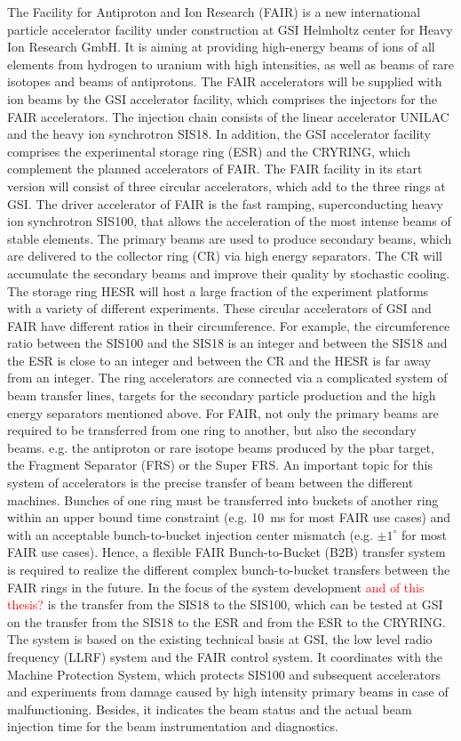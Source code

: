 The Facility for Antiproton and Ion Research (FAIR) is a new international particle accelerator facility under construction at GSI Helmholtz center for Heavy Ion Research GmbH. It is aiming at providing high-energy beams of ions of all elements from hydrogen to uranium with high intensities, as well as beams of rare isotopes and beams of antiprotons. The FAIR accelerators will be supplied with ion beams by the GSI accelerator facility, which comprises the injectors for the FAIR accelerators. The injection chain consists of the linear accelerator UNILAC and the heavy ion synchrotron SIS18. In addition, the GSI accelerator facility comprises the experimental storage ring (ESR) and the CRYRING, which complement the planned accelerators of FAIR. The FAIR facility in its start version will consist of three circular accelerators, which add to the three rings at GSI. The driver accelerator of FAIR is the fast ramping, superconducting heavy ion synchrotron SIS100, that allows the acceleration of the most intense beams of stable elements. The primary beams are used to produce secondary beams, which are delivered to the collector ring (CR) via high energy separators. The CR will accumulate the secondary beams and improve their quality by stochastic cooling. The storage ring HESR will host a large fraction of the experiment platforms with a variety of different experiments. These circular accelerators of GSI and FAIR have different ratios in their circumference. For example, the circumference ratio between the SIS100 and the SIS18 is an integer and between the SIS18 and the ESR is close to an integer and between the CR and the HESR is far away from an integer. The ring accelerators are connected via a complicated system of beam transfer lines, targets for the secondary particle production and the high energy separators mentioned above. For FAIR, not only the primary beams are required to be transferred from one ring to another, but also the secondary beams. e.g. the antiproton or rare isotope beams produced by the pbar target, the Fragment Separator (FRS) or the Super FRS. An important topic for this system of accelerators is the precise transfer of beam between the different machines. Bunches of one ring must be transferred into buckets of another ring within an upper bound time constraint (e.g. \SI{10}{\ms} for most FAIR use cases) and with an acceptable bunch-to-bucket injection center mismatch (e.g. $\pm1^\circ$ for most FAIR use cases). Hence, a flexible FAIR Bunch-to-Bucket (B2B) transfer system is required to realize the different complex bunch-to-bucket transfers between the FAIR rings in the future. In the focus of the system development \textcolor{red}{and of this thesis?} is the transfer from the SIS18 to the SIS100, which can be tested at GSI on the transfer from the SIS18 to the ESR and from the ESR to the CRYRING. The system is based on the existing technical basis at GSI, the low level radio frequency (LLRF) system and the FAIR control system. It coordinates with the Machine Protection System, which protects SIS100 and subsequent accelerators and experiments from damage caused by high intensity primary beams in case of malfunctioning. Besides, it indicates the beam status and the actual beam injection time for the beam instrumentation and diagnostics. 

